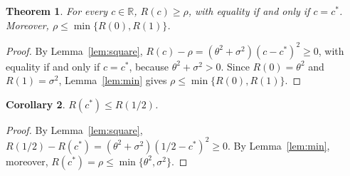 \documentclass[11pt]{article}
\newtheorem{theorem}{Theorem}[section]
\newtheorem{corollary}[theorem]{Corollary}
\theoremstyle{definition}
\begin{document}
\begin{theorem}\label{thm:oracle}
For every $c \in \mathbb{R}$, $R(c) \ge \rho$, with equality if and only if $c = c^\ast$. Moreover,
$\rho \le \min\{R(0), R(1)\}$.
\end{theorem}

\begin{proof}
By Lemma~\ref{lem:square}, $R(c) - \rho = (\theta^2 + \sigma^2)(c - c^\ast)^2 \ge 0$, with equality if and only if
$c = c^\ast$, because $\theta^2 + \sigma^2 > 0$. Since $R(0) = \theta^2$ and $R(1) = \sigma^2$,
Lemma~\ref{lem:min} gives $\rho \le \min\{R(0), R(1)\}$.
\end{proof}

\begin{corollary}\label{cor:half}
$R(c^\ast) \le R(1/2)$.
\end{corollary}

\begin{proof}
By Lemma~\ref{lem:square}, $R(1/2) - R(c^\ast) = (\theta^2 + \sigma^2)(1/2 - c^\ast)^2 \ge 0$. By
Lemma~\ref{lem:min}, moreover, $R(c^\ast) = \rho \le \min\{\theta^2, \sigma^2\}$.
\end{proof}
\end{document}
